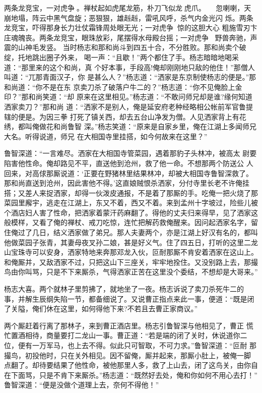 两条龙竞宝，一对虎争。禅杖起如虎尾龙筋，朴刀飞似龙虎爪。，
忽喇喇，天崩地塌，阵云中黑气盘旋；恶狠狠，雄赳赳，雷吼风呼，杀气内金光闪
烁。两条龙竞宝，吓得那身长力壮仗霜锋周处眼无光；一对虎争，惊的这胆大心
粗施雪刃卞庄魂魄丧。两条龙竞宝，眼珠放彩，尾摆得水母殿台摇；一对虎争，
野兽奔驰，声震的山神毛发竖。
当时杨志和那和尚斗到四五十合，不分胜败。那和尚卖个破绽，托地跳出圈子外来，
喝一声：“且歇！”两个都住了手。杨志暗暗地喝采道：“那里来的这个和尚，真
个好本事，手段高!俺却刚刚地只敌的他住！”那僧人叫道：“兀那青面汉子，你
是甚么人？”杨志道：“洒家是东京制使杨志的便是。”那和尚道：“你不是在东
京卖刀杀了破落户牛二的？”杨志道：“你不见俺脸上金印？”那和尚笑道：“却
原来在这里相见。”杨志道：“不敢问师兄却是谁?缘何知道洒家卖刀？”那和尚
道：“洒家不是别人，俺是延安府老种经略相公帐前军官鲁提辖的便是。为因三拳
打死了镇关西，却去五台山净发为僧。人见洒家背上有花绣，都叫俺做花和尚鲁智
深。”杨志笑道：“原来是自家乡里，俺在江湖上多闻师兄大名。听得说道，师兄
在大相国寺里挂搭，如今何故来在这里？”

鲁智深道：“一言难尽。洒家在大相国寺管菜园，遇着那豹子头林冲，被高太
尉要陷害他性命。俺却路见不平，直送他到沧州，救了他一命。不想那两个防送公
人回来，对高俅那厮说道：‘正要在野猪林里结果林冲，却被大相国寺鲁智深救了。
那和尚直送到沧州，因此害他不得。’这直娘贼恨杀洒家，分付寺里长老不许俺挂
搭；又差人来捉洒家，却得一伙泼皮通报，不是着了那厮的手。吃俺一把火烧了那
菜园里廨宇，逃走在江湖上，东又不着，西又不着。来到孟州十字坡过，险些儿被
个酒店妇人害了性命，把洒家着蒙汗药麻翻了。得他的丈夫归来得早，见了洒家这
般模样，又看了俺的禅杖、戒刀吃惊，连忙把解药救俺醒来。因问起洒家名字，留
住俺过了几日，结义洒家做了弟兄。那人夫妻两个，亦是江湖上好汉有名的，都叫
他做菜园子张青，其妻母夜叉孙二娘，甚是好义气。住了四五日，打听的这里二龙
山宝珠寺可以安身，洒家特地来奔那邓龙入伙，叵耐那厮不肯安着洒家在这山上。
和俺厮并，又敌洒家不过，只把这山下三座关，牢牢地拴住。又没别路上去，那撮
鸟由你叫骂，只是不下来厮杀，气得洒家正苦在这里没个委结，不想却是大哥来。”

杨志大喜。两个就林子里剪拂了，就地坐了一夜。杨志诉说了卖刀杀死牛二的
事，并解生辰纲失陷一节，都备细说了。又说曹正指点来此一事，便道：“既是闭
了关隘，俺们休在这里，如何得他下来?不若且去曹正家商议。”

两个厮赶着行离了那林子，来到曹正酒店里。杨志引鲁智深与他相见了，曹正
慌忙置酒相待，商量要打二龙山一事。曹正道：“若是端的闭了关时，休说道你二
位，便有一万军马，也上去不得。似此只可智取，不可力求。”鲁智深道：“叵耐
那撮鸟，初投他时，只在关外相见。因不留俺，厮并起来，那厮小肚上，被俺一脚
点翻了。却待要结果了他性命，被他那里人多，救了上山去，闭了这鸟关，由你自
在下面骂，只是不肯下来厮杀。”杨志道：“既然好去处，俺和你如何不用心去打！”
鲁智深道：“便是没做个道理上去，奈何不得他！”

